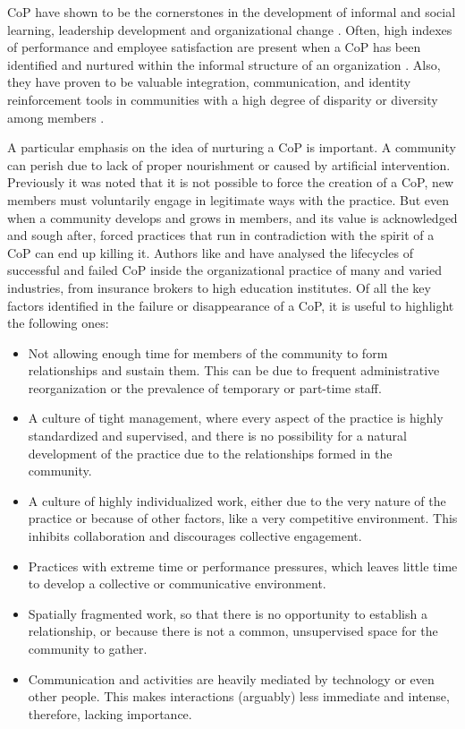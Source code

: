 \ac{CoP} have shown to be the cornerstones in the development of informal and social learning, leadership development and organizational change \parencite{anderson_2013}. Often, high indexes of performance and employee
satisfaction are present when a \ac{CoP} has been identified and nurtured within the informal structure of an organization \parencite{blackmore_2010}. Also, they have proven to be valuable integration, communication, and
identity reinforcement tools in communities with a high degree of disparity or diversity among members \parencite{hildreth_2004}.

A particular emphasis on the idea of nurturing a \ac{CoP} is important. A community can perish due to lack of proper nourishment or caused by artificial intervention. Previously it was noted that it is not possible to force the
creation of a \ac{CoP}, new members must voluntarily engage in legitimate ways with the practice. But even when a community develops and grows in members, and its value is acknowledged and sough after, forced practices that run
in contradiction with the spirit of a \ac{CoP} can end up killing it. Authors like \textcite{ardichvili_2003} and \textcite{brown_1991} have analysed the lifecycles of successful and failed \ac{CoP} inside the organizational
practice of many and varied industries, from insurance brokers to high education institutes. Of all the key factors identified in the failure or disappearance of a \ac{CoP}, it is useful to highlight the following ones:

\begin{itemize}
    \item Not allowing enough time for members of the community to form relationships and sustain them. This can be due to frequent administrative reorganization or the prevalence of temporary or part-time staff.
    \item A culture of tight management, where every aspect of the practice is highly standardized and supervised, and there is no possibility for a natural development of the practice due to the relationships formed in the community.
    \item A culture of highly individualized work, either due to the very nature of the practice or because of other factors, like a very competitive environment. This inhibits collaboration and discourages collective engagement.
    \item Practices with extreme time or performance pressures, which leaves little time to develop a collective or communicative environment.
    \item Spatially fragmented work, so that there is no opportunity to establish a relationship, or because there is not a common, unsupervised space for the community to gather.
    \item Communication and activities are heavily mediated by technology or even other people. This makes interactions (arguably) less immediate and intense, therefore, lacking importance.
\end{itemize}

